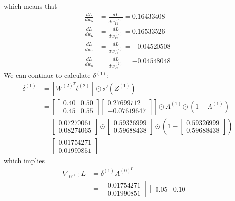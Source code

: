 \documentclass[a4paper, 12pt]{article}
\begin{document}
\begin{solution}
    which means that \begin{align*}
    \frac{dL}{dw_5} &= \frac{dL}{dw^{(2)}_{11}} =  0.16433408\\
        \frac{dL}{dw_6} &= \frac{dL}{dw^{(2)}_{12}} = 0.16533526\\
        \frac{dL}{dw_7} &= \frac{dL}{dw^{(2)}_{21}} = -0.04520508 \\
        \frac{dL}{dw_8} &= \frac{dL}{dw^{(2)}_{22}} = -0.04548048
    \end{align*}
    We can continue to calculate $\delta^{(1)}$:
    \begin{align*}
    \delta^{(1)} &= [W^{(2)^T} \delta^{(2)}] \odot \sigma'(Z^{(1)}) \\
    &= \left[\begin{bmatrix}
        0.40 & 0.50 \\
        0.45 & 0.55
    \end{bmatrix}\begin{bmatrix}
        0.27699712 \\
        -0.07619647
    \end{bmatrix}\right]  \odot A^{(1)} \odot (1-A^{(1)}) \\
    &= \begin{bmatrix}
        0.07270061 \\ 0.08274065
    \end{bmatrix}
    \odot \begin{bmatrix}
        0.59326999 \\ 0.59688438
        \end{bmatrix} \odot \left(1 - \begin{bmatrix}
            0.59326999 \\ 0.59688438
            \end{bmatrix}\right) \\
    &= \begin{bmatrix}
        0.01754271 \\ 0.01990851
    \end{bmatrix}
    \end{align*}
    which implies
    \begin{align*}
    \nabla_{W^{(1)}} L &= \delta^{(1)} A^{(0)^T} \\
    &= \begin{bmatrix}
        0.01754271 \\ 0.01990851
    \end{bmatrix}
    \begin{bmatrix}
    0.05 & 0.10
    \end{bmatrix} \\

\end{align*}
\end{solution}
\end{document}
